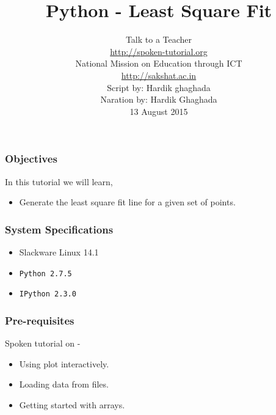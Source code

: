 \documentclass[17pt,compress]{beamer}
\author[FOSSEE]{}
\institute[IIT Bombay]{}
\date[]{}
\begin{document}
\sffamily \bfseries
\title
[Least Square Fit]
{Python - Least Square Fit}
\author
[FOSSEE, IIT - Bombay]
{\small Talk to a Teacher\\{\color{blue}\url{http://spoken-tutorial.org}}\\National Mission on Education
 through ICT\\{\color{blue}\url{http://sakshat.ac.in}} \\[0.5cm]{\tiny Script by: Hardik ghaghada \\ Naration by: Hardik Ghaghada \\ 13 August 2015}}

\begin{frame}
   \titlepage
\end{frame}
\begin{frame}
\frametitle{Objectives}
\label{sec-2}

  In this tutorial we will learn, \pause


\begin{itemize}
\item Generate the least square fit line for a
   given set of points.
\end{itemize}
\end{frame}
\begin{frame}
\frametitle{System Specifications}\pause
\begin{itemize}
\item Slackware Linux 14.1\pause
\item \texttt{Python 2.7.5} \pause
\item \texttt{IPython 2.3.0}
\end{itemize}
\end{frame}
\begin{frame}
\frametitle{Pre-requisites}
\label{sec-3}

  Spoken tutorial on -\pause

\begin{itemize}
\item Using plot interactively.\pause
\item Loading data from files.\pause
\item Getting started with arrays.
\end{itemize}
\end{frame}
\end{document}
